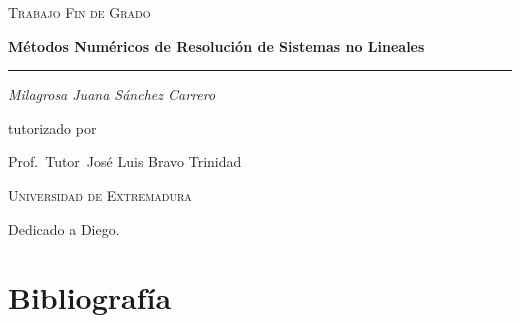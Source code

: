 \documentclass[\OPTfontsize, twoside]{book}
\begin{document}
\begin{titlepage}
  \centering
  {\scshape\Large Trabajo Fin de Grado\par}
  \vspace{1.5cm}
  {\huge\bfseries Métodos Numéricos de Resolución de Sistemas no Lineales\par}
  \vspace{0.025cm}
  \rule{0.4\textwidth}{0.4pt}
  \vspace{1cm}

  {\Large\itshape Milagrosa Juana Sánchez Carrero\par}
  \vspace{1cm}
  tutorizado por\par
  Prof.~Tutor~José Luis Bravo Trinidad\par
  \vspace{1cm}
  \vspace{7cm}

  {\scshape\LARGE Universidad de Extremadura \par}
  \vfill
\end{titlepage}

\maketitle

\begin{dedication}
Dedicado a Diego.  
\end{dedication}
\frontmatter

\tableofcontents

\mainmatter




\backmatter

\chapter*{Bibliografía}
\end{document}
